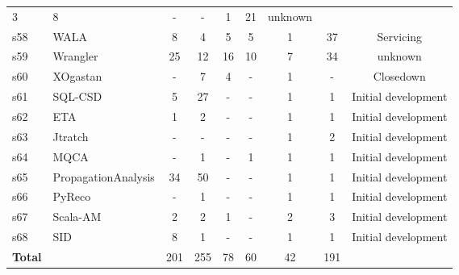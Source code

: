 \begin{table*}[htb]
\begin{tabular}{| l l | c c | c c c | c | c |}
  3 &
  8 &
  - &
  - &
  1 &
  21 &
  unknown \\
s58 &
  WALA &
  8 &
  4 &
  5 &
  5 &
  1 &
  37 &
  Servicing \\
s59 &
  Wrangler &
  25 &
  12 &
  16 &
  10 &
  7 &
  34 &
  unknown \\
s60 &
  XOgastan &
  - &
  7 &
  4 &
  - &
  1 &
  - &
  Closedown \\
s61 &
  SQL-CSD &
  5 &
  27 &
  - &
  - &
  1 &
  1 &
  Initial development \\
s62 &
  ETA &
  1 &
  2 &
  - &
  - &
  1 &
  1 &
  Initial development \\
s63 &
  Jtratch &
  - &
  - &
  - &
  - &
  1 &
  2 &
  Initial development \\
s64 &
  MQCA &
  - &
  1 &
  - &
  1 &
  1 &
  1 &
  Initial development \\
s65 &
  PropagationAnalysis &
  34 &
  50 &
  - &
  - &
  1 &
  1 &
  Initial development \\
s66 &
  PyReco &
  - &
  1 &
  - &
  - &
  1 &
  1 &
  Initial development \\
s67 &
  Scala-AM &
  2 &
  2 &
  1 &
  - &
  2 &
  3 &
  Initial development \\
s68 &
  SID &
  8 &
  1 &
  - &
  - &
  1 &
  1 &
  Initial development \\
  \hline
{\bf Total} &
            &
  201 &
  255 &
  78 &
  60 &
  42 &
  191 &
     \\
  \hline
\end{tabular}
\label{dataset-table-scam}
\end{table*}
